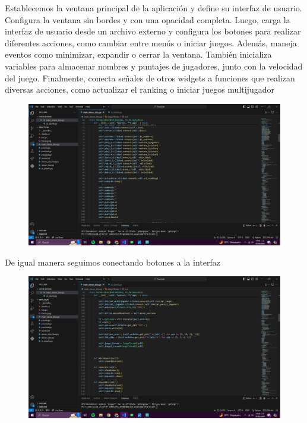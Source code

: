 \documentclass{article}
\begin{document}
{{\begin{figure}[h]
\end{figure}

{\Large Establecemos la ventana principal de la aplicación y define su interfaz de usuario. Configura la ventana sin bordes y con una opacidad completa. Luego, carga la interfaz de usuario desde un archivo externo y configura los botones para realizar diferentes acciones, como cambiar entre menús o iniciar juegos. Además, maneja eventos como minimizar, expandir o cerrar la ventana. También inicializa variables para almacenar nombres y puntajes de jugadores, junto con la velocidad del juego. Finalmente, conecta señales de otros widgets a funciones que realizan diversas acciones, como actualizar el ranking o iniciar juegos multijugador

}

\newpage
\begin{figure}[h]
    \centering
    \includegraphics[width=1\textwidth]{Captura de pantalla (766).png}
    
\end{figure}

{\Large De igual  manera seguimos conectando botones a la interfaz

}


\newpage
\begin{figure}[h]
    \centering
    \includegraphics[width=1\textwidth]{Captura de pantalla (767).png}
    

\end{figure}}}
\end{document}
